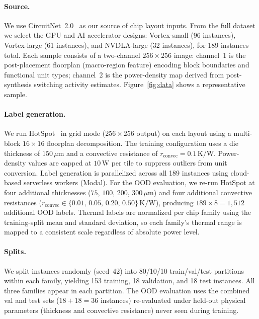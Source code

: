 \documentclass[10pt,twocolumn,letterpaper]{article}
\begin{document}
\paragraph{Source.}
We use CircuitNet~2.0~\cite{CircuitNet2} as our source of chip
layout inputs. From the full dataset we select the GPU and AI
accelerator designs: Vortex-small (96 instances), Vortex-large (61
instances), and NVDLA-large (32 instances), for 189 instances total.
Each sample consists of a two-channel $256\times256$ image: channel~1
is the post-placement floorplan (macro-region feature) encoding block
boundaries and functional unit types; channel~2 is the power-density
map derived from post-synthesis switching activity estimates.
Figure~\ref{fig:data} shows a representative sample.

\paragraph{Label generation.}
We run HotSpot~\cite{HotSpot} in grid mode ($256\times256$ output)
on each layout using a multi-block $16\times16$ floorplan
decomposition. The training configuration uses a die thickness of
$150\,\mu\text{m}$ and a convective resistance of
$r_\text{convec}{=}0.1\,\text{K/W}$. Power-density values are
capped at $10\,\text{W}$ per tile to suppress outliers from unit
conversion. Label generation is parallelized across all 189 instances
using cloud-based serverless workers (Modal). For the OOD evaluation,
we re-run HotSpot at four additional thicknesses ($75$, $100$, $200$,
$300\,\mu\text{m}$) and four additional convective resistances
($r_\text{convec}\in\{0.01,\,0.05,\,0.20,\,0.50\}\,\text{K/W}$),
producing $189\times 8 = 1{,}512$ additional OOD labels. Thermal
labels are normalized per chip family using the training-split mean
and standard deviation, so each family's thermal range is mapped to a
consistent scale regardless of absolute power level.

\paragraph{Splits.}
We split instances randomly (seed~42) into 80/10/10 train/val/test
partitions within each family, yielding 153 training, 18 validation,
and 18 test instances. All three families appear in each partition.
The OOD evaluation uses the combined val and test sets
($18+18=36$ instances) re-evaluated under held-out physical parameters
(thickness and convective resistance) never seen during training.
\end{document}
